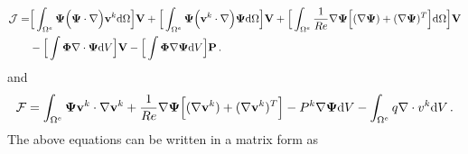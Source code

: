 \documentclass[]{article}
\begin{document}
\begin{equation}\label{eq14}
	\begin{aligned}
		\mathcal{J} =& \Big[\int_{\Omega^e} \boldsymbol{\Psi} \Big(\boldsymbol{\Psi} \cdot\nabla\Big) \mathbf{v}^k  \mathrm{d}\Omega\Big] \mathbf{V}
		+ \Big[\int_{\Omega^e}  \boldsymbol{\Psi} \Big(\mathbf{v}^k \cdot \nabla\Big) \boldsymbol{\Psi}\mathrm{d}\Omega\Big] \mathbf{V}
		+ \Big[\int_{\Omega^e}  \frac{1}{Re} \nabla \boldsymbol{\Psi} \Big[(\nabla \boldsymbol{\Psi}) +  (\nabla\boldsymbol{\Psi})^T\Big]\mathrm{d}\Omega \Big] \mathbf{V}\\
		&-\Big[\int \boldsymbol{\Phi} \nabla \cdot\boldsymbol{\Psi}  \mathrm{d}V \Big]\mathbf{V}
		-\Big[\int \boldsymbol{\Phi} \nabla \boldsymbol{\Psi}  \mathrm{d}V \Big]\mathbf{P} \thinspace.
	\end{aligned}
\end{equation}
and 
\begin{equation}\label{eq11}
	\begin{aligned}
		\mathcal{F} = \int_{\Omega^e} \boldsymbol{\Psi}\mathbf{v}^k \cdot \nabla \mathbf{v}^k + \frac{1}{Re} \nabla \boldsymbol{\Psi} \Big[(\nabla \mathbf{v}^k) + (\nabla \mathbf{v}^k)^T  \Big] - P^k\nabla \boldsymbol{\Psi}\mathrm{d}V  - \int_{\Omega^e}q \nabla \cdot v^k \mathrm{d}V \thinspace.
	\end{aligned}
\end{equation}
The above equations can be written in a matrix form as
\end{document}
